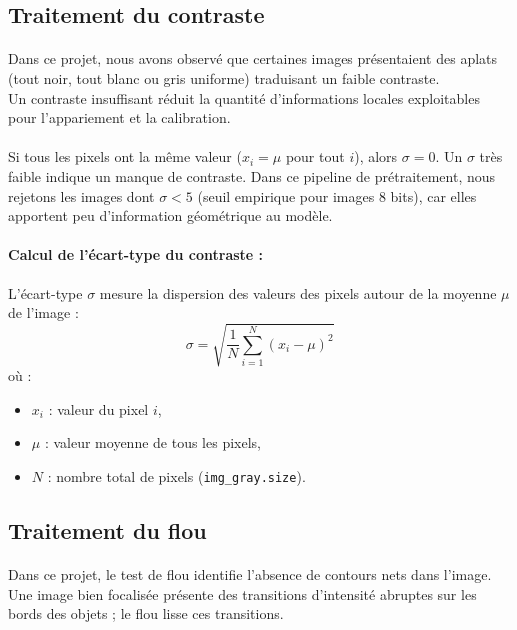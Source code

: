 \documentclass[12pt,a4paper,oneside]{report}
\begin{document}
\newpage

\subsection{Traitement du contraste}
\paragraph{}
Dans ce projet, nous avons observé que certaines images présentaient des aplats (tout noir, tout blanc ou gris uniforme) traduisant un faible contraste.\\
Un contraste insuffisant réduit la quantité d'informations locales exploitables pour l'appariement et la calibration.

\paragraph{}
Si tous les pixels ont la même valeur ($x_i = \mu$ pour tout $i$), alors $\sigma=0$. Un $\sigma$ très faible indique un manque de contraste. Dans ce pipeline de prétraitement, nous rejetons les images dont $\sigma < 5$ (seuil empirique pour images 8 bits), car elles apportent peu d'information géométrique au modèle.

\paragraph{Calcul de l'écart-type du contraste :}
L'écart-type $\sigma$ mesure la dispersion des valeurs des pixels autour de la moyenne $\mu$ de l'image :
\[
\sigma = \sqrt{\frac{1}{N} \sum_{i=1}^{N} (x_i - \mu)^2}
\]
où :
\begin{itemize}
    \item $x_i$ : valeur du pixel $i$,
    \item $\mu$ : valeur moyenne de tous les pixels,
    \item $N$ : nombre total de pixels (\texttt{img\_gray.size}).
\end{itemize}

\newpage

\subsection{Traitement du flou}

\paragraph{}
Dans ce projet, le test de flou identifie l'absence de contours nets dans l'image. Une image bien focalisée présente des transitions d'intensité abruptes sur les bords des objets ; le flou lisse ces transitions.
\end{document}
